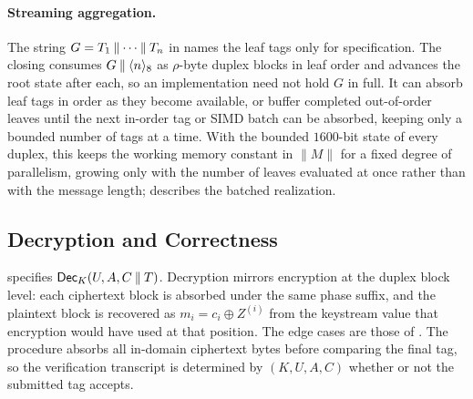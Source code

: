 \paragraph{Streaming aggregation.}
The string $G = T_1 \mathbin{\|} \cdots \mathbin{\|} T_n$ in
 names the leaf tags only for specification. The
closing  consumes $G \mathbin{\|} \langle n \rangle_8$ as
$\rho$-byte duplex blocks in leaf order and advances the root state
after each, so an implementation need not hold $G$ in full. It can absorb
leaf tags in order as they become available, or buffer completed
out-of-order leaves until the next in-order tag or SIMD batch can be
absorbed, keeping only a bounded number of tags at a time. With
the bounded $1600$-bit state of every duplex, this keeps the working
memory constant in $\|M\|$ for a fixed degree of parallelism, growing
only with the number of leaves evaluated at once rather than with the
message length;  describes the batched realization.

\subsection{Decryption and Correctness}
\label{sec:dec}

 specifies $\mathsf{Dec}_K(U, A, C \mathbin{\|} T)$. Decryption mirrors
encryption at the duplex block level: each ciphertext block is absorbed under
the same phase suffix, and the plaintext block is recovered as
$m_i = c_i \oplus Z^{(i)}$ from the keystream value that encryption would have
used at that position. The edge cases are those of . The
procedure absorbs all in-domain ciphertext bytes before comparing the final tag,
so the verification transcript is determined by $(K, U, A, C)$ whether or not the
submitted tag accepts.

